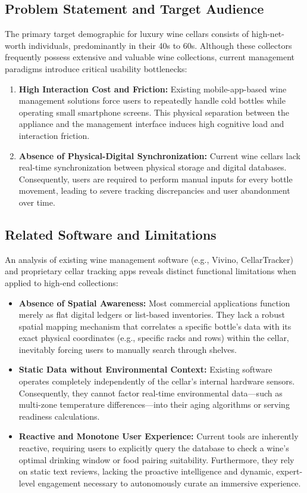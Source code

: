 \documentclass[conference]{IEEEtran}
\begin{document}
\subsection{Problem Statement and Target Audience}
The primary target demographic for luxury wine cellars consists of high-net-worth individuals, predominantly in their 40s to 60s. Although these collectors frequently possess extensive and valuable wine collections, current management paradigms introduce critical usability bottlenecks:
\begin{enumerate}
    \item \textbf{High Interaction Cost and Friction:} Existing mobile-app-based wine management solutions force users to repeatedly handle cold bottles while operating small smartphone screens. This physical separation between the appliance and the management interface induces high cognitive load and interaction friction.
    \item \textbf{Absence of Physical-Digital Synchronization:} Current wine cellars lack real-time synchronization between physical storage and digital databases. Consequently, users are required to perform manual inputs for every bottle movement, leading to severe tracking discrepancies and user abandonment over time.
\end{enumerate}

\subsection{Related Software and Limitations}
An analysis of existing wine management software (e.g., Vivino, CellarTracker) and proprietary cellar tracking apps reveals distinct functional limitations when applied to high-end collections:
\begin{itemize}
    \item \textbf{Absence of Spatial Awareness:} Most commercial applications function merely as flat digital ledgers or list-based inventories. They lack a robust spatial mapping mechanism that correlates a specific bottle's data with its exact physical coordinates (e.g., specific racks and rows) within the cellar, inevitably forcing users to manually search through shelves.
    \item \textbf{Static Data without Environmental Context:} Existing software operates completely independently of the cellar's internal hardware sensors. Consequently, they cannot factor real-time environmental data---such as multi-zone temperature differences---into their aging algorithms or serving readiness calculations.
    \item \textbf{Reactive and Monotone User Experience:} Current tools are inherently reactive, requiring users to explicitly query the database to check a wine's optimal drinking window or food pairing suitability. Furthermore, they rely on static text reviews, lacking the proactive intelligence and dynamic, expert-level engagement necessary to autonomously curate an immersive experience.
\end{itemize}
\end{document}
